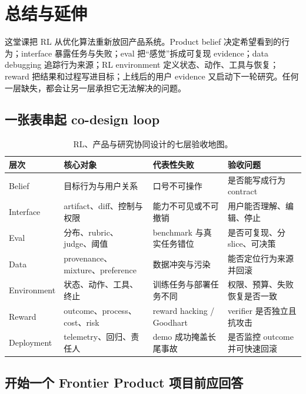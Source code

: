 \section{总结与延伸}

这堂课把 RL 从优化算法重新放回产品系统。Product belief 决定希望看到的行为；interface 暴露任务与失败；eval 把“感觉”拆成可复现 evidence；data debugging 追踪行为来源；RL environment 定义状态、动作、工具与恢复；reward 把结果和过程写进目标；上线后的用户 evidence 又启动下一轮研究。任何一层缺失，都会让另一层承担它无法解决的问题。

\subsection{一张表串起 co-design loop}

\begin{table}[H]
\centering
\small
\begin{tabular}{@{}L{0.16\textwidth}L{0.24\textwidth}L{0.27\textwidth}L{0.23\textwidth}@{}}
\toprule
层次 & 核心对象 & 代表性失败 & 验收问题 \\
\midrule
Belief & 目标行为与用户关系 & 口号不可操作 & 是否能写成行为 contract \\
Interface & artifact、diff、控制与权限 & 能力不可见或不可撤销 & 用户能否理解、编辑、停止 \\
Eval & 分布、rubric、judge、阈值 & benchmark 与真实任务错位 & 是否可复现、分 slice、可决策 \\
Data & provenance、mixture、preference & 数据冲突与污染 & 能否定位行为来源并回滚 \\
Environment & 状态、动作、工具、终止 & 训练任务与部署任务不同 & 权限、预算、失败恢复是否一致 \\
Reward & outcome、process、cost、risk & reward hacking / Goodhart & verifier 是否独立且抗攻击 \\
Deployment & telemetry、回归、责任人 & demo 成功掩盖长尾事故 & 是否监控 outcome 并可快速回滚 \\
\bottomrule
\end{tabular}
\caption{RL、产品与研究协同设计的七层验收地图。}
\end{table}

\subsection{开始一个 Frontier Product 项目前应回答}

